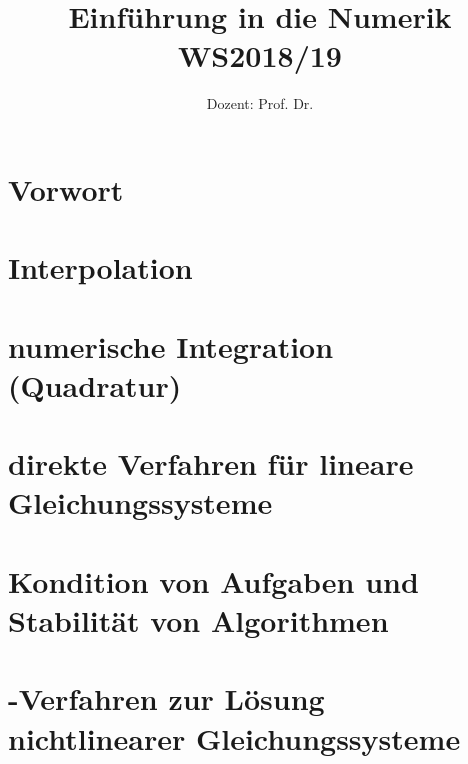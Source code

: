 \documentclass[ngerman,a4paper,order=firstname]{../../texmf/tex/latex/mathscript/mathscript}
\title{\textbf{Einführung in die Numerik WS2018/19}}
\author{Dozent: Prof. Dr. \person{Andreas Fischer}}
\begin{document}
\pagestyle{plain}

\maketitle

\hypertarget{tocpage}{}
\tableofcontents
{}

\pagebreak
{}
\pagestyle{fancy}

\chapter*{Vorwort}


\chapter{Interpolation}




\chapter{numerische Integration (Quadratur)}






\chapter{direkte Verfahren für lineare Gleichungssysteme}





\chapter{Kondition von Aufgaben und Stabilität von Algorithmen}



\chapter{-Verfahren zur Lösung nichtlinearer Gleichungssysteme}


\end{document}
